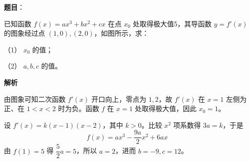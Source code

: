 \begin{answer}

\textbf{题目}：

已知函数 $f(x)=ax^3+bx^2+cx$ 在点 $x_0$ 处取得极大值5，其导函数 $y=f'(x)$ 的图象经过点 $(1,0),(2,0)$，如图所示，求：

（1） $x_0$ 的值；

（2） $a,b,c$ 的值。
\nopagebreak[4]
\begin{center}\end{center}
\nopagebreak[4]
\textbf{解析}


由图象可知二次函数 $f'(x)$ 开口向上，零点为 $1,2$，故 $f'(x)$ 在 $x=1$ 左侧为正、在 $1<x<2$ 时为负。函数 $f$ 在 $x=1$ 处取得极大值，因此 $x_0=1$。


设 $f'(x)=k(x-1)(x-2)$，其中 $k>0$。比较 $x^2$ 项系数得 $3a=k$，于是
\nopagebreak[4]
\[
f(x)=a x^3-\frac{9a}{2}x^2+6ax
\]
由 $f(1)=5$ 得 $\dfrac52a=5$，所以 $a=2$，进而 $b=-9,c=12$。



\end{answer}
